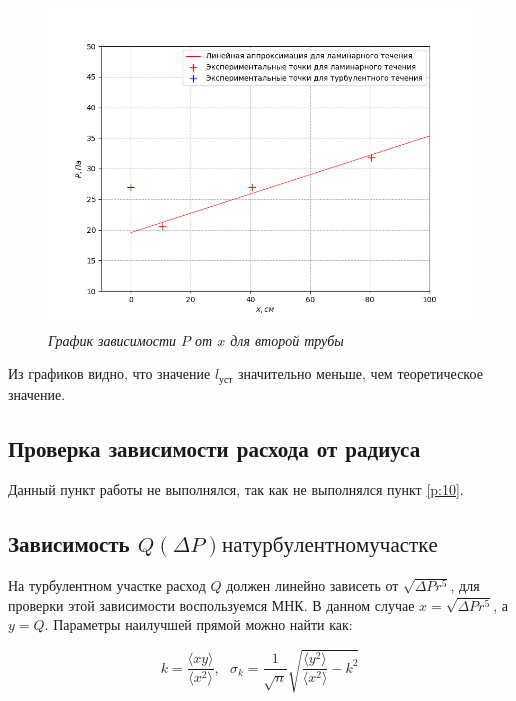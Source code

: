 \documentclass[a4paper,12pt]{article}
\begin{document}
\begin{figure}[h!]
        \centering
	\includegraphics[width=1\textwidth]{graph_p-x_2.png}
	\caption{\textit{График зависимости $P$ от $x$ для второй трубы}}
	\label{graph:p-x-2}
\end{figure}

Из графиков видно, что значение $l_\text{уст}$ значительно меньше, чем теоретическое значение.

\clearpage

\subsection{Проверка зависимости расхода от радиуса}

Данный пункт работы не выполнялся, так как не выполнялся пункт \ref{p:10}.

\subsection{Зависимость $Q(\Delta P) на турбулентном участке$}

На турбулентном участке расход $Q$ должен линейно зависеть от $\sqrt{\Delta P r^5}$, для проверки этой зависимости воспользуемся МНК. В данном случае $x = \sqrt{\Delta P r^5}$, а $y = Q$. Параметры наилучшей прямой можно найти как:

\begin{equation}\label{eq:mnk-linear}
    k = \frac{\langle x y \rangle}{\langle x^2 \rangle}, \ \ \ \sigma_k = \frac{1}{\sqrt{n}} \sqrt{\frac{\langle y^2 \rangle}{\langle x^2 \rangle} - k^2}
\end{equation}
\end{document}
